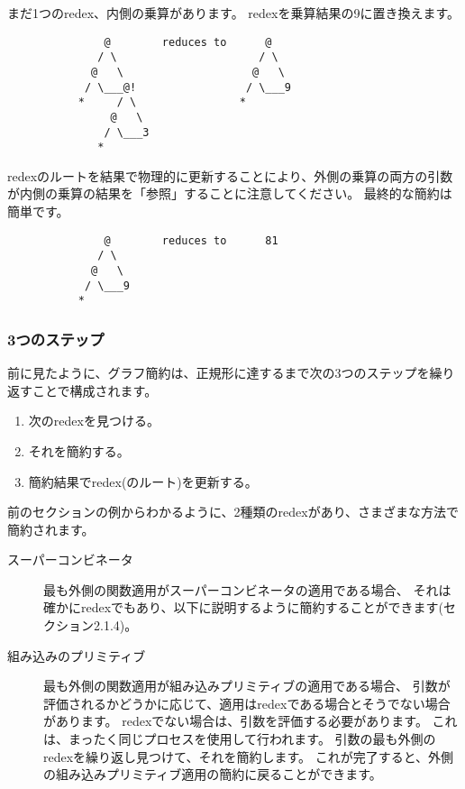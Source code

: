\documentclass{jarticle}
\begin{document}
まだ1つのredex、内側の乗算があります。
redexを乗算結果の9に置き換えます。

\begin{verbatim}
               @        reduces to      @
              / \                      / \
             @   \                    @   \
            / \___@!                 / \___9
           *     / \                *
                @   \
               / \___3
              *
\end{verbatim}

redexのルートを結果で物理的に更新することにより、外側の乗算の両方の引数が内側の乗算の結果を「参照」することに注意してください。
最終的な簡約は簡単です。

\begin{verbatim}
               @        reduces to      81
              / \
             @   \
            / \___9
           *
\end{verbatim}

\subsubsection{3つのステップ}

前に見たように、グラフ簡約は、正規形に達するまで次の3つのステップを繰り返すことで構成されます。

\begin{enumerate}
	\item 次のredexを見つける。
	\item それを簡約する。
	\item 簡約結果でredex(のルート)を更新する。
\end{enumerate}

前のセクションの例からわかるように、2種類のredexがあり、さまざまな方法で簡約されます。

\begin{description}
	\item[スーパーコンビネータ] 最も外側の関数適用がスーパーコンビネータの適用である場合、
	      それは確かにredexでもあり、以下に説明するように簡約することができます(セクション2.1.4)。
	\item[組み込みのプリミティブ] 最も外側の関数適用が組み込みプリミティブの適用である場合、
	      引数が評価されるかどうかに応じて、適用はredexである場合とそうでない場合があります。
	      redexでない場合は、引数を評価する必要があります。
	      これは、まったく同じプロセスを使用して行われます。
	      引数の最も外側のredexを繰り返し見つけて、それを簡約します。
	      これが完了すると、外側の組み込みプリミティブ適用の簡約に戻ることができます。
\end{description}
\end{document}
